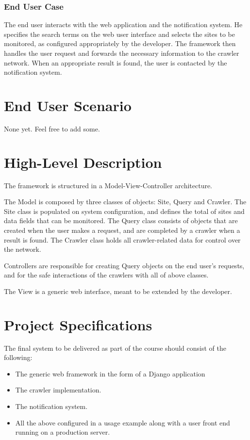 \documentclass[a4paper,10pt]{article} \usepackage{anysize}
\begin{document}
    \subsubsection{End User Case}
        The end user interacts with the web application and the
        notification system. He specifies the search terms on the web user
        interface and selects the sites to be monitored, as configured
        appropriately by the developer. The framework then handles the
        user request and forwards the necessary information to the crawler
        network. When an appropriate result is found, the user is
        contacted by the notification system. 

\section{End User Scenario}
    None yet. Feel free to add some.

\section{High-Level Description}
    The framework is structured in a Model-View-Controller architecture. 

    The Model is composed by three classes of objects: Site, Query and Crawler.
    The Site class is populated on system configuration, and defines the total
    of sites and data fields that can be monitored. The Query class consists of
    objects that are created when the user makes a request, and are completed
    by a crawler when a result is found. The Crawler class holds all
    crawler-related data for control over the network. 
    
    Controllers are responsible for creating Query objects on the end user's
    requests, and for the safe interactions of the crawlers with all of above
    classes. 
    
    The View is a generic web interface, meant to be extended by the developer.

\section{Project Specifications}
    The final system to be delivered as part of the course should consist of
    the following:
    \begin{itemize}
            \item The generic web framework in the form of a Django application
            \item The crawler implementation.
            \item The notification system.
            \item All the above configured in a usage example along with a user
                front end running on a production server.
    \end{itemize}
\end{document}
